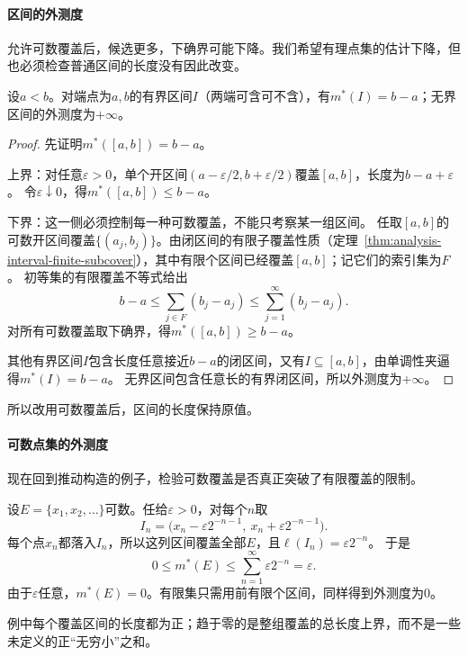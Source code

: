 \paragraph{区间的外测度}

允许可数覆盖后，候选更多，下确界可能下降。我们希望有理点集的估计下降，但也必须检查普通区间的长度没有因此改变。
\begin{lemma}[区间的外测度等于长度]
\label{lem:set-measure-interval-outer-measure}
设$a<b$。对端点为$a,b$的有界区间$I$（两端可含可不含），有$m^*(I)=b-a$；无界区间的外测度为$+\infty$。
\end{lemma}
\begin{proof}
先证明$m^*([a,b])=b-a$。

上界：对任意$\varepsilon>0$，单个开区间$(a-\varepsilon/2,b+\varepsilon/2)$覆盖$[a,b]$，长度为$b-a+\varepsilon$。
令$\varepsilon\downarrow0$，得$m^*([a,b])\leq b-a$。

下界：这一侧必须控制每一种可数覆盖，不能只考察某一组区间。
任取$[a,b]$的可数开区间覆盖$\{(a_j,b_j)\}$。由闭区间的有限子覆盖性质（定理~\ref{thm:analysis-interval-finite-subcover}），其中有限个区间已经覆盖$[a,b]$；记它们的索引集为$F$。
初等集的有限覆盖不等式给出
\[
 b-a\leq\sum_{j\in F}(b_j-a_j)\leq\sum_{j=1}^{\infty}(b_j-a_j).
\]
对所有可数覆盖取下确界，得$m^*([a,b])\geq b-a$。

其他有界区间$I$包含长度任意接近$b-a$的闭区间，又有$I\subseteq[a,b]$，由单调性夹逼得$m^*(I)=b-a$。
无界区间包含任意长的有界闭区间，所以外测度为$+\infty$。
\end{proof}

所以改用可数覆盖后，区间的长度保持原值。

\paragraph{可数点集的外测度}

现在回到推动构造的例子，检验可数覆盖是否真正突破了有限覆盖的限制。
\begin{example}[可数点集的外测度为零]
\label{ex:set-measure-countable-outer-null}
设$E=\{x_1,x_2,\ldots\}$可数。任给$\varepsilon>0$，对每个$n$取
\[
 I_n=\bigl(x_n-\varepsilon2^{-n-1},\ x_n+\varepsilon2^{-n-1}\bigr).
\]
每个点$x_n$都落入$I_n$，所以这列区间覆盖全部$E$，且$\ell(I_n)=\varepsilon2^{-n}$。
于是
\[
 0\leq m^*(E)\leq\sum_{n=1}^{\infty}\varepsilon2^{-n}=\varepsilon.
\]
由于$\varepsilon$任意，$m^*(E)=0$。有限集只需用前有限个区间，同样得到外测度为$0$。
\end{example}

例中每个覆盖区间的长度都为正；趋于零的是整组覆盖的总长度上界，而不是一些未定义的正“无穷小”之和。

